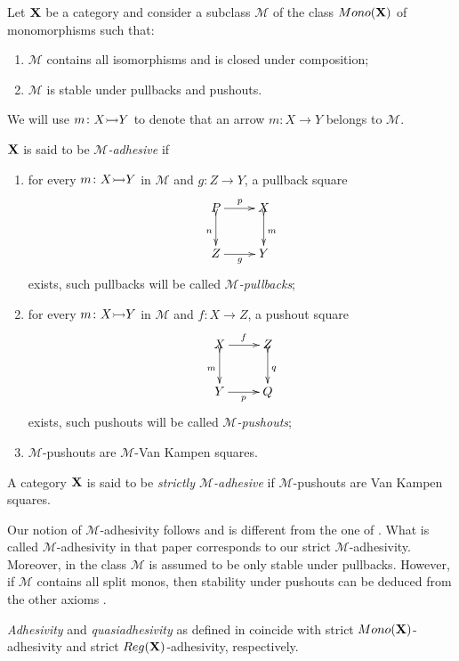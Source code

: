 \documentclass[a4paper,UKenglish,cleveref,pdftex, thm-restate,numberwithinsect]{lipics}
\newcommand{\mon}{\mathsf{Mono}}
\newcommand{\reg}{\mathsf{Reg}}
\newcommand{\mto}[0]{\scalebox{1}{$\rightarrowtail$}}
\def\X{\textbf {\textup{X}}}
\begin{document}
\begin{definition}
	Let $\X$ be a category and consider a subclass $\mathcal{M}$ of the class $\mon(\X)$ of monomorphisms such that:
	\begin{enumerate}
		\item $\mathcal{M}$ contains all isomorphisms and is closed under composition;
		\item $\mathcal{M}$ is stable under pullbacks and pushouts.
	\end{enumerate} 
	We will use $m\colon X\mto Y$ to denote that an arrow $m\colon X\to Y$ belongs to $\mathcal{M}$. 
	
	$\X$ is said to be \emph{$\mathcal{M}$-adhesive} if
	\begin{enumerate}
		\item for every $m\colon X\mto Y$ in $\mathcal{M}$ and $g\colon Z\to Y$, a pullback square
		\[\xymatrix{P\ar[r]^p \ar@{>->}[d]_{n}& X \ar@{>->}[d]^{m}\\ Z \ar[r]_g& Y}\]
		exists, such pullbacks will be called \emph{$\mathcal{M}$-pullbacks};
		\item for every $m\colon X\mto Y$ in $\mathcal{M}$ and $f\colon X\to Z$, a pushout square
		\[\xymatrix{X \ar[r]^f \ar@{>->}[d]_{m}& Z \ar@{>->}[d]^{q}\\ Y\ar[r]_p &Q}\]
		exists, such pushouts  will be called \emph{$\mathcal{M}$-pushouts}; 
		\item  $\mathcal{M}$-pushouts are $\mathcal{M}$-Van Kampen squares.
	\end{enumerate}
	
A category $\X$ is said to be \emph{strictly $\mathcal{M}$-adhesive} if $\mathcal{M}$-pushouts are Van Kampen squares.	
\end{definition}

\begin{remark}\label{rem:diff}Our notion of $\mathcal{M}$-adhesivity follows \cite{ehrig2012,ehrig2014adhesive} and is different from the one of \cite{azzi2019essence}. What is called $\mathcal{M}$-adhesivity in that paper corresponds to our strict $\mathcal{M}$-adhesivity. Moreover, in \cite{azzi2019essence} the class $\mathcal{M}$ is assumed to be only stable under pullbacks. However, if $\mathcal{M}$ contains all split monos, then stability under pushouts can be deduced from the other axioms \cite[Prop.~$5.1.21$]{castelnovo2023thesis}.
\end{remark}


\begin{remark}\label{rem:salva} 
	\emph{Adhesivity} and \emph{quasiadhesivity} as defined in \cite{lack2005adhesive,garner2012axioms}  coincide with  strict $\mon(\X) $-adhesivity and strict $\reg(\X)$-adhesivity, respectively. 
\end{remark}
\end{document}
